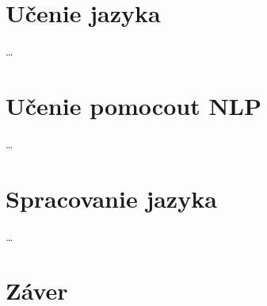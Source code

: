\documentclass[10pt,twoside,slovak,a4paper]{article}
\begin{document}
\section{Učenie jazyka} \label{ucenie_jazyka}

\ldots


\section{Učenie pomocout NLP} \label{ucenie_pomocou_nlp}


\ldots


\section{Spracovanie jazyka} \label{spracovanie_jazyka}

\ldots


\section{Záver} \label{zaver} %




 
\end{document}
